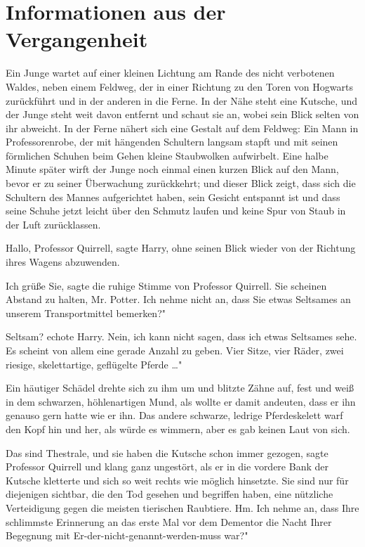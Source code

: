 \chapter{Informationen aus der Vergangenheit}

Ein Junge wartet auf einer kleinen Lichtung am Rande des nicht verbotenen
Waldes, neben einem Feldweg, der in einer Richtung zu den Toren von Hogwarts
zurückführt und in der anderen in die Ferne. In der Nähe steht eine Kutsche, und
der Junge steht weit davon entfernt und schaut sie an, wobei sein Blick selten
von ihr abweicht. In der Ferne nähert sich eine Gestalt auf dem Feldweg: Ein
Mann in Professorenrobe, der mit hängenden Schultern langsam stapft und mit
seinen förmlichen Schuhen beim Gehen kleine Staubwolken aufwirbelt. Eine halbe
Minute später wirft der Junge noch einmal einen kurzen Blick auf den Mann, bevor
er zu seiner Überwachung zurückkehrt; und dieser Blick zeigt, dass sich die
Schultern des Mannes aufgerichtet haben, sein Gesicht entspannt ist und dass
seine Schuhe jetzt leicht über den Schmutz laufen und keine Spur von Staub in
der Luft zurücklassen.

\glqq{}Hallo, Professor Quirrell\grqq{}, sagte Harry, ohne seinen Blick wieder
von der Richtung ihres Wagens abzuwenden.

\glqq{}Ich grüße Sie\grqq{}, sagte die ruhige Stimme von Professor Quirrell.
\glqq{}Sie scheinen Abstand zu halten, Mr. Potter. Ich nehme nicht an, dass Sie
etwas Seltsames an unserem Transportmittel bemerken?"

\glqq{}Seltsam?\grqq{} echote Harry. \glqq{}Nein, ich kann nicht sagen, dass ich
etwas Seltsames sehe. Es scheint von allem eine gerade Anzahl zu geben. Vier
Sitze, vier Räder, zwei riesige, skelettartige, geflügelte Pferde …"

Ein häutiger Schädel drehte sich zu ihm um und blitzte Zähne auf, fest und weiß
in dem schwarzen, höhlenartigen Mund, als wollte er damit andeuten, dass er ihn
genauso gern hatte wie er ihn. Das andere schwarze, ledrige Pferdeskelett warf
den Kopf hin und her, als würde es wimmern, aber es gab keinen Laut von sich.

\glqq{}Das sind Thestrale, und sie haben die Kutsche schon immer gezogen\grqq{},
sagte Professor Quirrell und klang ganz ungestört, als er in die vordere Bank
der Kutsche kletterte und sich so weit rechts wie möglich hinsetzte. \glqq{}Sie
sind nur für diejenigen sichtbar, die den Tod gesehen und begriffen haben, eine
nützliche Verteidigung gegen die meisten tierischen Raubtiere. Hm. Ich nehme an,
dass Ihre schlimmste Erinnerung an das erste Mal vor dem Dementor die Nacht
Ihrer Begegnung mit Er-der-nicht-genannt-werden-muss war?"

